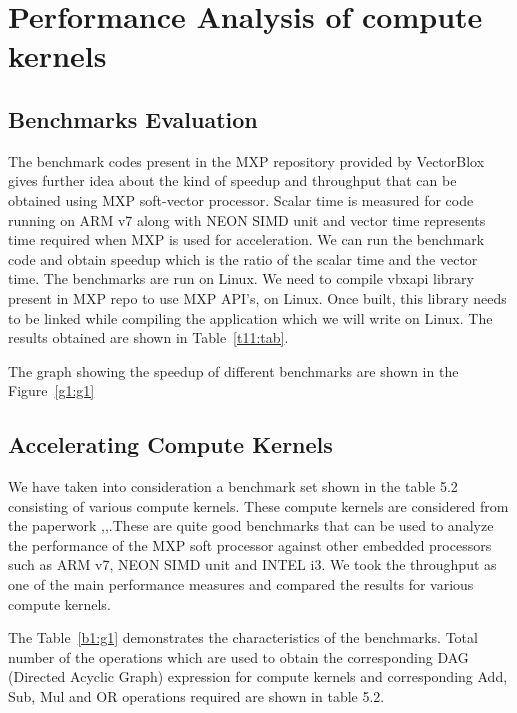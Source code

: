 \newpage
\chapter{Performance Analysis of compute kernels}

\section{Benchmarks Evaluation}

The benchmark codes present in the MXP repository provided by VectorBlox gives further idea about the kind of speedup and throughput that can be obtained using MXP soft-vector processor. Scalar time is measured for code running on ARM v7 along with NEON SIMD unit and vector time represents time required when MXP is used for acceleration. We can run the benchmark code and obtain speedup which is the ratio of the scalar time and the vector time. The benchmarks are run on Linux. We need to compile vbxapi library present in MXP repo to use MXP API’s, on Linux.  Once built, this library needs to be linked while compiling the application which we will write on Linux. The results obtained are shown in Table~\ref{t11:tab}.





The graph showing the speedup of different benchmarks are shown in the Figure~\ref{g1:g1}




\section{Accelerating Compute Kernels}
We have taken into consideration a benchmark set shown in the table 5.2 consisting of various compute kernels. These compute kernels are considered from the paperwork \cite{21},\cite{22},\cite{23}.These are quite good benchmarks that can be used to analyze the performance of the MXP soft processor against other embedded processors such as ARM v7, NEON SIMD unit and INTEL i3. We took the throughput as one of the main performance measures and compared the results for various compute kernels.




The Table~\ref{b1:g1} demonstrates the characteristics of the benchmarks. Total number of the operations which are used to obtain the corresponding DAG (Directed Acyclic Graph) expression for compute kernels and corresponding Add, Sub, Mul and OR operations required are shown in table 5.2. 


